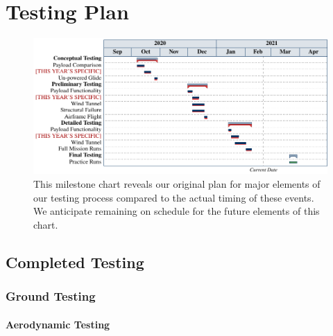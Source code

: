 \section{Testing Plan} %
\label{sec:TestingPlan}


\begin{figure}[h!]
	\centering
	\includegraphics[]{compiled_figures/testingchart.pdf}
	\caption{This milestone chart reveals our {\color{\BYUblue}original plan} for major elements of our testing process compared to the {\color{\BYUred}actual timing} of these events. We anticipate remaining on schedule for the {\color{\BYUgreen} future elements} of this chart.}
	\label{fig:plannedvsactualtimingtesting}
\end{figure}



\subsection{Completed Testing}
\label{ssec:completedtesting}

\lipsum[1-2]


\subsubsection{Ground Testing}
\label{sssec:groundtesting}

\paragraph{Aerodynamic Testing}

